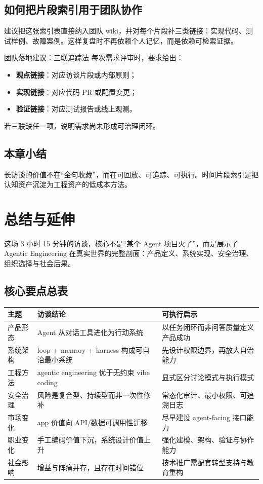 \documentclass[a4paper]{article}
\begin{document}
\subsection{如何把片段索引用于团队协作}

建议把这张索引表直接纳入团队 wiki，并对每个片段补三类链接：实现代码、测试样例、故障案例。这样复盘时不再依赖个人记忆，而是依赖可检索证据。

\begin{importantbox}{团队落地建议：三联追踪法}
每次需求评审时，要求给出：
\begin{itemize}
    \item \textbf{观点链接}：对应访谈片段或内部原则；
    \item \textbf{实现链接}：对应代码 PR 或配置变更；
    \item \textbf{验证链接}：对应测试报告或线上观测。
\end{itemize}
若三联缺任一项，说明需求尚未形成可治理闭环。
\end{importantbox}

\subsection{本章小结}
长访谈的价值不在“金句收藏”，而在可回放、可追踪、可执行。时间片段索引是把认知资产沉淀为工程资产的低成本方法。

\section{总结与延伸}

这场 3 小时 15 分钟的访谈，核心不是“某个 Agent 项目火了”，而是展示了 Agentic Engineering 在真实世界的完整剖面：产品定义、系统实现、安全治理、组织选择与社会后果。

\subsection{核心要点总表}
\begin{longtable}{p{}p{}p{}}
\toprule
\textbf{主题} & \textbf{访谈结论} & \textbf{可执行启示} \\
\midrule
产品形态 & Agent 从对话工具进化为行动系统 & 以任务闭环而非问答质量定义产品成功 \\
\midrule
系统架构 & loop + memory + harness 构成可自治最小系统 & 先设计权限边界，再放大自治能力 \\
\midrule
工程方法 & agentic engineering 优于无约束 vibe coding & 显式区分讨论模式与执行模式 \\
\midrule
安全治理 & 风险是复合型、持续型而非一次性修补 & 常态化审计、最小权限、可追溯日志 \\
\midrule
市场变化 & app 价值向 API/数据可调用性迁移 & 尽早建设 agent-facing 接口能力 \\
\midrule
职业变化 & 手工编码价值下沉，系统设计价值上升 & 强化建模、架构、验证与协作能力 \\
\midrule
社会影响 & 增益与阵痛并存，且存在时间错位 & 技术推广需配套转型支持与教育重构 \\
\bottomrule
\end{longtable}
\end{document}
